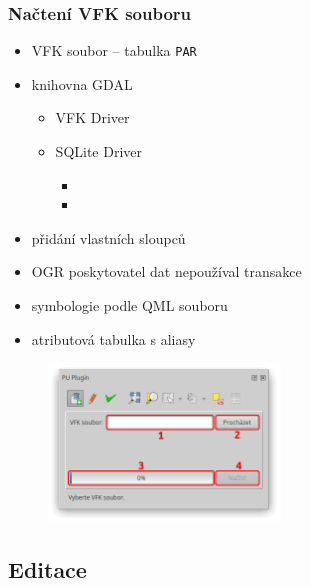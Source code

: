 \documentclass{beamer}
\begin{document}
\begin{frame}

\frametitle{Načtení VFK souboru}

\begin{itemize}
	\item VFK soubor – tabulka \texttt{PAR}
	\item knihovna GDAL
	\begin{itemize}
		\item VFK Driver
		\item SQLite Driver
		\begin{itemize}
			\item \texttt{}
			\item \texttt{}
		\end{itemize}
	\end{itemize}
	\item přidání vlastních sloupců
	\item OGR poskytovatel dat nepoužíval transakce
	\item symbologie podle QML souboru
	\item atributová tabulka s aliasy
\end{itemize}

\begin{figure}[ht]
	\includegraphics[width=0.55\textwidth]{pictures/nacteni_vfk_gui.png}
\end{figure}

\end{frame}


\subsection{Editace}
\end{document}
